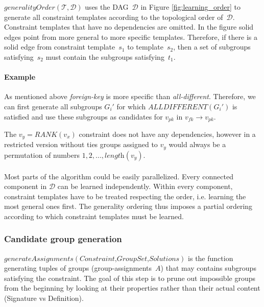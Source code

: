 \documentclass{ecai}
\newcommand{\constraints}{\ensuremath{\mathcal{T}}\xspace}
\newcommand{\format}[1]{\textit{#1}\xspace}
\newcommand{\generategroups}{\format{generateAssignments}}
\newcommand{\constrainttorder}{\format{generalityOrder}}
\newcommand{\CSignature}{Signature\xspace}
\newcommand{\CFunction}{Definition\xspace}
\newcommand{\dependencies}{\ensuremath{\mathcal{D}}\xspace}
\newcommand{\eccalc}[2]{\ensuremath{#1 = #2}}
\newcommand{\ecrank}[2]{\eccalc{#1}{\mathit{RANK}(#2)}}
\newcommand{\ecfkey}[2]{\ensuremath{#1 \rightarrow #2}}
\newcommand{\ecalldiff}[1]{\ensuremath{\mathit{ALLDIFFERENT}(#1)}}
\begin{document}
$\constrainttorder(\constraints,\dependencies)$ uses the DAG~\dependencies in Figure \ref{fig:learning_order} to generate all constraint templates according to the topological order of~\dependencies.
Constraint templates that have no dependencies are omitted.
In the figure solid edges point from more general to more specific templates.
Therefore, if there is a solid edge from constraint template~$s_1$ to template~$s_2$, then a set of subgroups satisfying~$s_2$ must contain the subgroups satisfying~$t_1$.


\paragraph{Example}
As mentioned above \textit{foreign-key} is more specific than \textit{all-different}.
Therefore, we can first generate all subgroups $G_i'$ for which \ecalldiff{G_i'} is satisfied and use these subgroups as candidates for $v_{pk}$ in \ecfkey{v_{fk}}{v_{pk}}.

The \ecrank{v_y}{v_x} constraint does not have any dependencies, however in a restricted version without ties groups assigned to $v_y$ would always be a permutation of numbers $1, 2, ..., \textit{length}(v_y)$.
\\\\
Most parts of the algorithm could be easily parallelized.
Every connected component in \dependencies can be learned independently.
Within every component, constraint templates have to be treated respecting the order, i.e. learning the most general ones first.
The generality ordering thus imposes a partial ordering according to which constraint templates must be learned.

\subsubsection{Candidate group generation}
$\generategroups(\textit{Constraint,GroupSet,Solutions})$ is the function generating tuples of groups (group-assignments~$A$) that may contains subgroups satisfying the constraint.
The goal of this step is to prune out impossible groups from the beginning by looking at their properties rather than their actual content (\CSignature vs \CFunction).
\end{document}
